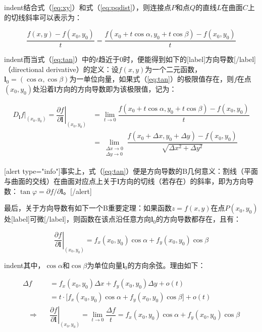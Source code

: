 \documentclass[UTF8,nofonts]{ctexart}
\begin{document}
indent结合式（\ref{eq:xy}）和式（\ref{eq:pqdist}），则连接点$P$和点$Q$的直线$L$在曲面$C$上的切线斜率可以表示为：

\begin{equation}
\label{eq:tan}
\dfrac{f(x,y)-f(x_0,y_0)}{t}=
\dfrac{f(x_0+t\cos\alpha,y_0+t\cos\beta)-f(x_0,y_0)}{t}
\end{equation}

indent而当式（\ref{eq:tan}）中的$t$趋近于$0$时，便能得到如下的[label]方向导数[/label]（directional derivative）的定义：设$f(x,y)$为一个二元函数，$\boldsymbol{l}_0=(\cos\alpha,\cos\beta)$为一单位向量，如果式（\ref{eq:tan}）的极限值存在，则$f$在点$(x_0,y_0)$处沿着$\boldsymbol{l}$方向的方向导数即为该极限值，记为：

\begin{equation}
\label{eq:dddef}
\begin{aligned}
\left.D_{\boldsymbol{l}}f\right|_{(x_0,y_0)}=\left.\dfrac{\partial f}{\partial \boldsymbol{l}}\right|_{(x_0,y_0)} &= \lim_{t\to0}\dfrac{f(x_0+t\cos\alpha,y_0+t\cos\beta)-f(x_0,y_0)}{t} \\
&= \lim_{\substack{\Delta x\to0\\\Delta y\to0}}\dfrac{f(x_0+\Delta x,y_0+\Delta y)-f(x_0,y_0)}{\sqrt{\Delta x^2+\Delta y^2}}
\end{aligned}
\end{equation}

[alert type="info"]事实上，式（\ref{eq:tan}）便是方向导数的B几何意义：割线（平面与曲面的交线）在曲面对应点上关于$\boldsymbol{l}$方向的切线（若存在）的斜率，即为方向导数：$\tan\varphi=\partial f/\partial \boldsymbol{l}$。[/alert]

最后，关于方向导数有如下一个B重要定理：如果函数$z=f(x,y)$在点$P(x_0,y_0)$处[label]可微[/label]，则函数在该点沿任意方向$\boldsymbol{l}_0$的方向导数都存在，且有：

\begin{equation}
\label{eq:ddfinal}
\left.\dfrac{\partial f}{\partial \boldsymbol{l}}\right|_{(x_0,y_0)}=f_x(x_0,y_0)\cos\alpha+f_y(x_0,y_0)\cos\beta
\end{equation}

indent其中，$\cos\alpha$和$\cos\beta$为单位向量$\boldsymbol{l}_0$的方向余弦。理由如下：

\begin{equation*}
\begin{aligned}
\Delta f &= f_x(x_0,y_0)\Delta x + f_y(x_0,y_0)\Delta y+o(t) \\
&= t\cdot\big[f_x(x_0,y_0)\cos\alpha+f_y(x_0,y_0)\cos\beta\big]+o(t) \\
\quad\Longrightarrow\quad
&\left.\dfrac{\partial f}{\partial\boldsymbol{l}}\right|_{(x_0,y_0)}=\lim_{t\to0}\dfrac{\Delta f}{t}=f_x(x_0,y_0)\cos\alpha+f_y(x_0,y_0)\cos\beta
\end{aligned}
\end{equation*}
\end{document}
